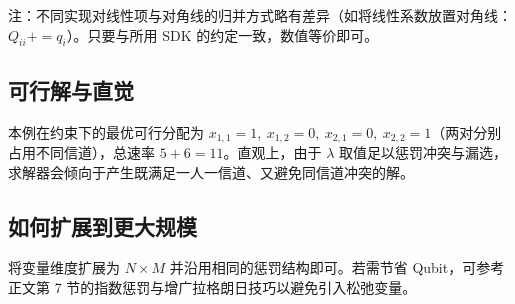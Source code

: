 \documentclass[11pt,a4paper]{article}
\begin{document}
注：不同实现对线性项与对角线的归并方式略有差异（如将线性系数放置对角线：$Q_{ii}+=q_i$）。只要与所用 SDK 的约定一致，数值等价即可。

\subsection*{可行解与直觉}
本例在约束下的最优可行分配为 $x_{1,1}=1,\ x_{1,2}=0,\ x_{2,1}=0,\ x_{2,2}=1$（两对分别占用不同信道），总速率 $5+6=11$。直观上，由于 $\lambda$ 取值足以惩罚冲突与漏选，求解器会倾向于产生既满足一人一信道、又避免同信道冲突的解。

\subsection*{如何扩展到更大规模}
将变量维度扩展为 $N\times M$ 并沿用相同的惩罚结构即可。若需节省 Qubit，可参考正文第 7 节的指数惩罚与增广拉格朗日技巧以避免引入松弛变量。
\end{document}
